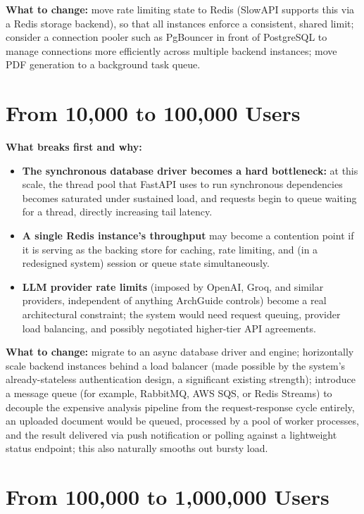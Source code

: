 \documentclass[11pt,a4paper]{report}
\begin{document}
\textbf{What to change:} move rate limiting state to Redis (SlowAPI supports this via a Redis storage backend), so that all instances enforce a consistent, shared limit; consider a connection pooler such as PgBouncer in front of PostgreSQL to manage connections more efficiently across multiple backend instances; move PDF generation to a background task queue.

\section{From 10,000 to 100,000 Users}

\textbf{What breaks first and why:}
\begin{itemize}[leftmargin=*]
  \item \textbf{The synchronous database driver becomes a hard bottleneck:} at this scale, the thread pool that FastAPI uses to run synchronous dependencies becomes saturated under sustained load, and requests begin to queue waiting for a thread, directly increasing tail latency.
  \item \textbf{A single Redis instance's throughput} may become a contention point if it is serving as the backing store for caching, rate limiting, and (in a redesigned system) session or queue state simultaneously.
  \item \textbf{LLM provider rate limits} (imposed by OpenAI, Groq, and similar providers, independent of anything ArchGuide controls) become a real architectural constraint; the system would need request queuing, provider load balancing, and possibly negotiated higher-tier API agreements.
\end{itemize}

\textbf{What to change:} migrate to an async database driver and engine; horizontally scale backend instances behind a load balancer (made possible by the system's already-stateless authentication design, a significant existing strength); introduce a message queue (for example, RabbitMQ, AWS SQS, or Redis Streams) to decouple the expensive analysis pipeline from the request-response cycle entirely, an uploaded document would be queued, processed by a pool of worker processes, and the result delivered via push notification or polling against a lightweight status endpoint; this also naturally smooths out bursty load.

\section{From 100,000 to 1,000,000 Users}
\end{document}
